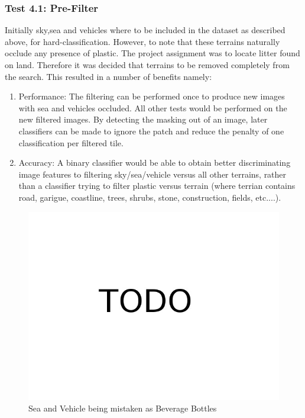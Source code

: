 \documentclass{IEEEtran}
\begin{document}
\subsubsection{Test 4.1: Pre-Filter} Initially sky,sea and vehicles where to be included in the dataset as described above, for hard-classification. However, to note that these terrains naturally occlude any presence of plastic. The project assignment was to locate litter found on land. Therefore it was decided that terrains to be removed completely from the search. This resulted in a number of benefits namely:
\begin{enumerate}
\item Performance: The filtering can be performed once to produce new images with sea and vehicles occluded. All other tests would be performed on the new filtered images. By detecting the masking out of an image, later classifiers can be made to ignore the patch and reduce the penalty of one classification per filtered tile.
\item Accuracy: A binary classifier would be able to obtain better discriminating image features to filtering sky/sea/vehicle versus all other terrains, rather than a classifier trying to filter plastic versus terrain (where terrian contains road, garigue, coastline, trees, shrubs, stone, construction, fields, etc....). 
\end{enumerate}

\begin{figure}[H]
\centering
\includegraphics[scale=0.25]{images/todo.jpg}
\caption{Sea and Vehicle being mistaken as Beverage Bottles}
\label{fig:mistakes}
\end{figure}
\end{document}
